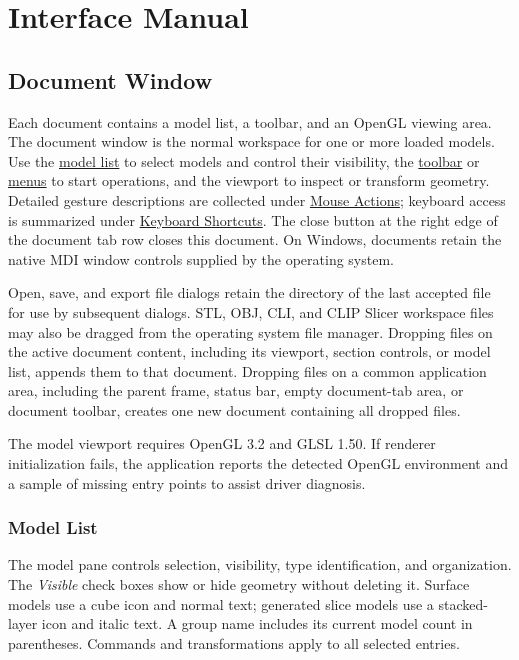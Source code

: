 
\chapter{Interface Manual}
\label{interface-manual}

\section{Document Window}
\label{document-window}

Each document contains a model list, a toolbar, and an OpenGL viewing area.
The document window is the normal workspace for one or more loaded models.
Use the \hyperref[model-list]{model list} to select models and control their
visibility, the \hyperref[document-toolbar]{toolbar} or
\hyperref[document-menus]{menus} to start operations, and the viewport to
inspect or transform geometry. Detailed gesture descriptions are collected
under \hyperref[mouse-actions]{Mouse Actions}; keyboard access is summarized
under \hyperref[keyboard-shortcuts]{Keyboard Shortcuts}. The close button at
the right edge of the document tab row closes this document.
On Windows, documents retain
the native MDI window controls supplied by the operating system.

Open, save, and export file dialogs retain the directory of the last accepted
file for use by subsequent dialogs. STL, OBJ, CLI, and CLIP Slicer workspace files
may also be dragged from the operating system file manager. Dropping files on the active document content,
including its viewport, section controls, or model list, appends them to that
document. Dropping files on a common application area, including the parent
frame, status bar, empty document-tab area, or document toolbar, creates one
new document containing all dropped files.

The model viewport requires OpenGL 3.2 and GLSL 1.50. If renderer
initialization fails, the application reports the detected OpenGL environment and a sample of missing entry points to assist driver
diagnosis.

\subsection{Model List}
\label{model-list}

The model pane controls selection, visibility, type identification, and
organization. The \emph{Visible} check boxes show or hide geometry without
deleting it. Surface models use a cube icon and normal text; generated slice
models use a stacked-layer icon and italic text. A group name includes its
current model count in parentheses. Commands and transformations apply to all
selected entries.

